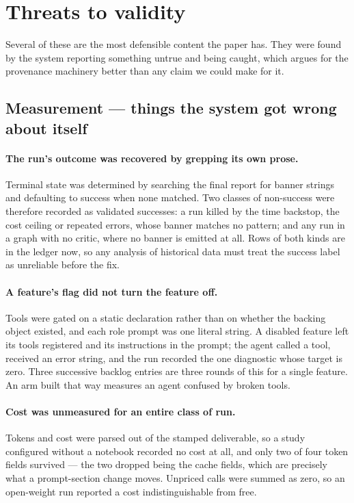 \section{Threats to validity}
\label{sec:threats}

Several of these are the most defensible content the paper has. They were found
by the system reporting something untrue and being caught, which argues for the
provenance machinery better than any claim we could make for it.

\subsection{Measurement --- things the system got wrong about itself}

\paragraph{The run's outcome was recovered by grepping its own prose.}
Terminal state was determined by searching the final report for banner strings
and defaulting to success when none matched. Two classes of non-success were
therefore recorded as validated successes: a run killed by the time backstop,
the cost ceiling or repeated errors, whose banner matches no pattern; and any
run in a graph with no critic, where no banner is emitted at all. Rows of both
kinds are in the ledger now, so any analysis of historical data must treat the
success label as unreliable before the fix.

\paragraph{A feature's flag did not turn the feature off.}
Tools were gated on a static declaration rather than on whether the backing
object existed, and each role prompt was one literal string. A disabled feature
left its tools registered and its instructions in the prompt; the agent called
a tool, received an error string, and the run recorded the one diagnostic whose
target is zero. Three successive backlog entries are three rounds of this for a
single feature. An arm built that way measures an agent confused by broken
tools.

\paragraph{Cost was unmeasured for an entire class of run.}
Tokens and cost were parsed out of the stamped deliverable, so a study
configured without a notebook recorded no cost at all, and only two of four
token fields survived --- the two dropped being the cache fields, which are
precisely what a prompt-section change moves. Unpriced calls were summed as
zero, so an open-weight run reported a cost indistinguishable from free.

